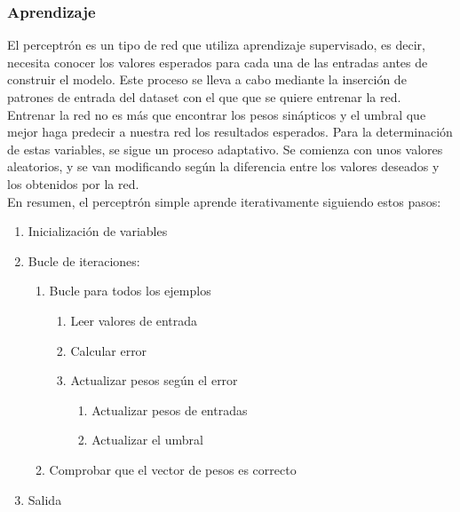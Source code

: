 \subsubsection{Aprendizaje}
El perceptrón es un tipo de red que utiliza aprendizaje supervisado, es decir, necesita conocer los valores esperados para cada una de las entradas antes de construir el modelo. Este proceso se lleva a cabo mediante la inserción de patrones de entrada del dataset con el que que se quiere entrenar la red.\\
Entrenar la red no es más que encontrar los pesos sinápticos y el umbral que mejor haga predecir a nuestra red los resultados esperados. Para la determinación de estas variables, se sigue un proceso adaptativo. Se comienza con unos valores aleatorios, y se van modificando según la diferencia entre los valores deseados y los obtenidos por la red.\\
En resumen, el perceptrón simple aprende iterativamente siguiendo estos pasos:
\begin{enumerate}
\item Inicialización de variables
\item Bucle de iteraciones:
\begin{enumerate}
\item Bucle para todos los ejemplos
\begin{enumerate}
\item Leer valores de entrada
\item Calcular error
\item Actualizar pesos según el error
\begin{enumerate}
\item Actualizar pesos de entradas
\item Actualizar el umbral
\end{enumerate}
\end{enumerate}
\item Comprobar que el vector de pesos es correcto
\end{enumerate}
\item Salida
\end{enumerate}

